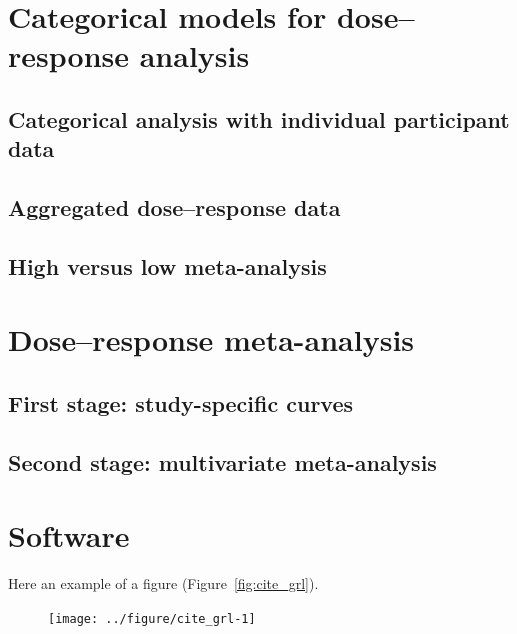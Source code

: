 \documentclass[11pt,a4paper,twoside,openany]{book}\usepackage{knitr}
\begin{document}
{\section{Categorical models for dose--response analysis}





\newpage

\subsection{Categorical analysis with individual participant data}

\subsection{Aggregated dose--response data}

\subsection{High versus low meta-analysis}



\section{Dose--response meta-analysis}

\subsection{First stage: study-specific curves}

\subsection{Second stage: multivariate meta-analysis}



\section{Software}



Here an example of a figure (Figure~\ref{fig:cite_grl}).

\begin{knitrout}
\color{fgcolor}\begin{figure}[ht!]

{\centering \texttt{[image: ../figure/cite\_grl-1]} 

}
\end{figure}
\end{knitrout}}
\end{document}
